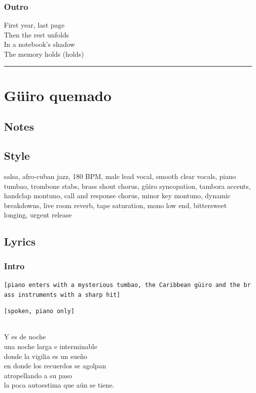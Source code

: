 \documentclass[]{article}
\begin{document}
\subsubsection{Outro}\label{outro-8}

First year, last page\\
Then the rest unfolds\\
In a notebook's shadow\\
The memory holds (holds)

\begin{center}\rule{0.5\linewidth}{0.5pt}\end{center}

\section{Güiro quemado}\label{guxfciro-quemado}

\subsection{Notes}\label{notes-30}

\subsection{Style}\label{style-30}

salsa, afro-cuban jazz, 180 BPM, male lead vocal, smooth clear vocals,
piano tumbao, trombone stabs, brass shout chorus, güiro syncopation,
tambora accents, handclap montuno, call and response chorus, minor key
montuno, dynamic breakdowns, live room reverb, tape saturation, mono low
end, bittersweet longing, urgent release

\subsection{Lyrics}\label{lyrics-30}

\subsubsection{Intro}\label{intro-11}

\texttt{{[}piano\ enters\ with\ a\ mysterious\ tumbao,\ the\ Caribbean\ güiro\ and\ the\ brass\ instruments\ with\ a\ sharp\ hit{]}}

\texttt{{[}spoken,\ piano\ only{]}}\strut \\
Y es de noche\\
una noche larga e interminable\\
donde la vigilia es un sueño\\
en donde los recuerdos se agolpan\\
atropellando a su paso\\
la poca autoestima que aún se tiene.
\end{document}

